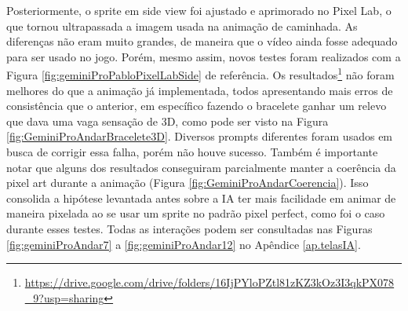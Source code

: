 Posteriormente, o sprite em side view foi ajustado e aprimorado no Pixel Lab, o que tornou ultrapassada a imagem usada na animação de caminhada. As diferenças não eram muito grandes, de maneira que o vídeo ainda fosse adequado para ser usado no jogo. Porém, mesmo assim, novos testes foram realizados com a Figura \ref{fig:geminiProPabloPixelLabSide} de referência. Os resultados\footnote{\url{https://drive.google.com/drive/folders/16IjPYloPZtl81zKZ3kOz3I3qkPX078_9?usp=sharing}} não foram melhores do que a animação já implementada, todos apresentando mais erros de consistência que o anterior, em específico fazendo o bracelete ganhar um relevo que dava uma vaga sensação de 3D, como pode ser visto na Figura \ref{fig:GeminiProAndarBracelete3D}. Diversos prompts diferentes foram usados em busca de corrigir essa falha, porém não houve sucesso. Também é importante notar que alguns dos resultados conseguiram parcialmente manter a coerência da pixel art durante a animação (Figura \ref{fig:GeminiProAndarCoerencia}). Isso consolida a hipótese levantada antes sobre a IA ter mais facilidade em animar de maneira pixelada ao se usar um sprite no padrão pixel perfect, como foi o caso durante esses testes. Todas as interações podem ser consultadas nas Figuras \ref{fig:geminiProAndar7} a \ref{fig:geminiProAndar12} no Apêndice \ref{ap.telasIA}.

